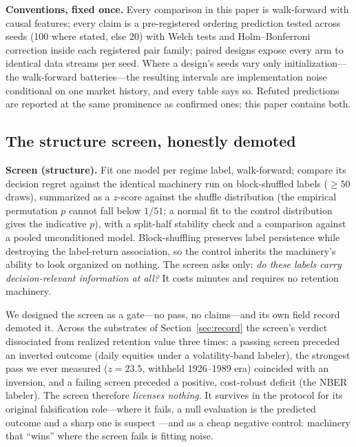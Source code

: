 \documentclass[sigconf,anonymous]{acmart}
\begin{document}
\textbf{Conventions, fixed once.} Every comparison in this paper is
walk-forward with causal features; every claim is a pre-registered
ordering prediction tested across seeds (100 where stated, else 20)
with Welch tests and Holm--Bonferroni correction inside each
registered pair family; paired designs expose every arm to identical
data streams per seed. Where a design's seeds vary only
initialization---the walk-forward batteries---the resulting intervals
are implementation noise conditional on one market history, and every
table says so. Refuted predictions are reported at the same prominence
as confirmed ones; this paper contains both.

\subsection{The structure screen, honestly demoted}
\label{sec:screen}

\textbf{Screen (structure).} Fit one model per regime label, walk-forward;
compare its decision regret against the identical machinery run on
block-shuffled labels ($\ge 50$ draws), summarized as a $z$-score against
the shuffle distribution (the empirical permutation $p$ cannot fall below
$1/51$; a normal fit to the control distribution gives the indicative
$p$), with a split-half stability check and a comparison against a pooled
unconditioned model. Block-shuffling preserves label persistence while
destroying the label-return association, so the control inherits the
machinery's ability to look organized on nothing. The screen asks only:
\emph{do these labels carry decision-relevant information at all?} It
costs minutes and requires no retention machinery.

We designed the screen as a gate---no pass, no claims---and its own field
record demoted it. Across the substrates of Section~\ref{sec:record} the
screen's verdict dissociated from realized retention value three times:
a passing screen preceded an inverted outcome (daily equities under a
volatility-band labeler), the strongest pass we ever measured
($z = 23.5$, withheld 1926--1989 era) coincided with an inversion, and a
failing screen preceded a positive, cost-robust deficit (the NBER
labeler). The screen therefore \emph{licenses nothing}. It survives in
the protocol for its original falsification role---where it fails,
a null evaluation is the predicted outcome and a sharp one is suspect
---and as a cheap negative control: machinery that ``wins'' where the
screen fails is fitting noise.
\end{document}
